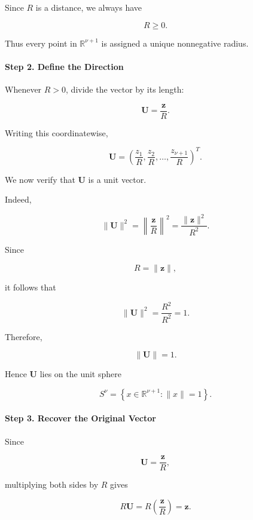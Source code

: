 \documentclass[11pt]{article}
\begin{document}
\begin{mdframed}[
		linewidth=0.8pt,
		roundcorner=6pt,
		backgroundcolor=gray!5,
		linecolor=gray!60,
		innertopmargin=10pt,
		innerbottommargin=10pt,
		innerleftmargin=10pt,
		innerrightmargin=10pt
		]
		Since $R$ is a distance, we always have
		
		\[
		R\ge0.
		\]
		
		Thus every point in $\mathbb R^{\nu+1}$ is assigned a unique nonnegative
		radius.
		
		\vspace{0.3cm}
		
		\paragraph{Step 2. Define the Direction}
		
		Whenever $R>0$, divide the vector by its length:
		
		\[
		\mathbf U
		=
		\frac{\mathbf z}{R}.
		\]
		
		Writing this coordinatewise,
		
		\[
		\mathbf U
		=
		\left(
		\frac{z_1}{R},
		\frac{z_2}{R},
		\ldots,
		\frac{z_{\nu+1}}{R}
		\right)^T.
		\]
		
		We now verify that $\mathbf U$ is a unit vector.
		
		Indeed,
		
		\[
		\|\mathbf U\|^2
		=
		\left\|
		\frac{\mathbf z}{R}
		\right\|^2
		=
		\frac{\|\mathbf z\|^2}{R^2}.
		\]
		
		Since
		
		\[
		R=\|\mathbf z\|,
		\]
		
		it follows that
		
		\[
		\|\mathbf U\|^2
		=
		\frac{R^2}{R^2}
		=
		1.
		\]
		
		Therefore,
		
		\[
		\boxed{
			\|\mathbf U\|=1.
		}
		\]
		
		Hence $\mathbf U$ lies on the unit sphere
		
		\[
		S^\nu
		=
		\left\{
		x\in\mathbb R^{\nu+1}
		:
		\|x\|=1
		\right\}.
		\]
		
		\vspace{0.3cm}
		
		\paragraph{Step 3. Recover the Original Vector}
		
		Since
		
		\[
		\mathbf U
		=
		\frac{\mathbf z}{R},
		\]
		
		multiplying both sides by $R$ gives
		
		\[
		R\mathbf U
		=
		R
		\left(
		\frac{\mathbf z}{R}
		\right)
		=
		\mathbf z.
		\]
		

\end{mdframed}
\end{document}
